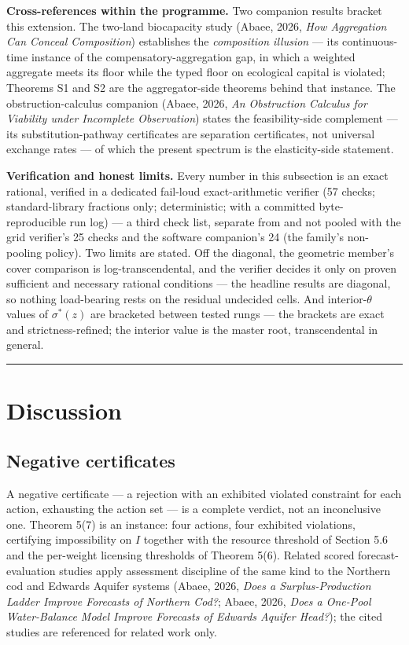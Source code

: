 \documentclass[3p,11pt]{elsarticle}
\begin{document}
\textbf{Cross-references within the programme.} Two companion results
bracket this extension. The two-land biocapacity study (Abaee, 2026,
\emph{How Aggregation Can Conceal Composition}) establishes the
\emph{composition illusion} --- its continuous-time instance of the
compensatory-aggregation gap, in which a weighted aggregate meets its
floor while the typed floor on ecological capital is violated; Theorems S1
and S2 are the aggregator-side theorems behind that instance. The
obstruction-calculus companion (Abaee, 2026, \emph{An Obstruction
Calculus for Viability under Incomplete Observation}) states the
feasibility-side complement --- its substitution-pathway certificates are
separation certificates, not universal exchange rates --- of which the
present spectrum is the elasticity-side statement.

\textbf{Verification and honest limits.} Every number in this subsection
is an exact rational, verified in a dedicated fail-loud exact-arithmetic
verifier (57 checks; standard-library fractions only; deterministic; with
a committed byte-reproducible run log) --- a third check list, separate
from and not pooled with the grid verifier's 25 checks and the software
companion's 24 (the family's non-pooling policy). Two limits are stated.
Off the diagonal, the geometric member's cover comparison is
log-transcendental, and the verifier decides it only on proven sufficient
and necessary rational conditions --- the headline results are diagonal,
so nothing load-bearing rests on the residual undecided cells. And
interior-\(\theta\) values of \(\sigma^*(z)\) are bracketed between
tested rungs --- the brackets are exact and strictness-refined; the
interior value is the master root, transcendental in general.

\begin{center}\rule{0.5\linewidth}{0.5pt}\end{center}

\section{Discussion}\label{discussion}

\subsection{Negative certificates}\label{negative-certificates}

A negative certificate --- a rejection with an exhibited violated constraint for each action, exhausting the action set --- is a complete verdict, not an inconclusive one. Theorem 5(7) is an instance: four actions, four exhibited violations, certifying impossibility on \(I\) together with the resource threshold of Section 5.6 and the per-weight licensing thresholds of Theorem 5(6). Related scored forecast-evaluation studies apply assessment discipline of the same kind to the Northern cod and Edwards Aquifer systems (Abaee, 2026, \emph{Does a Surplus-Production Ladder Improve Forecasts of Northern Cod?}; Abaee, 2026, \emph{Does a One-Pool Water-Balance Model Improve Forecasts of Edwards Aquifer Head?}); the cited studies are referenced for related work only.
\end{document}
